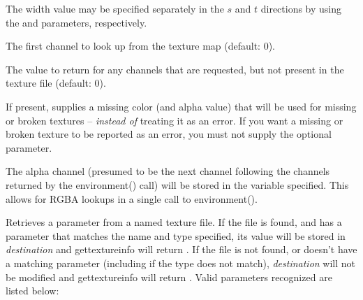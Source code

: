 \documentclass[11pt,letterpaper]{book}
\begin{document}
The width value may be specified separately in the $s$ and $t$
directions by using the  and  parameters,
respectively.
\apiend
\vspace{-16pt}

\vspace{12pt}
The first channel to look up from the texture map (default: 0).
\apiend
\vspace{-16pt}

\vspace{12pt}
The value to return for any channels that are requested, but 
not present in the texture file (default: 0).
\apiend
\vspace{-16pt}

\vspace{12pt}
If present, supplies a missing color (and alpha value) that will
be used for missing or broken textures -- \emph{instead of} treating
it as an error.  If you want a missing or broken texture to be reported
as an error, you must not supply the optional 
parameter.
\apiend
\vspace{-16pt}

\vspace{12pt}
The alpha channel (presumed to be the next channel following the
channels returned by the {\cf environment()} call) will be stored in the
variable specified.  This allows for RGBA lookups in a single call to
{\cf environment()}.
\apiend
\vspace{-16pt}

\apiend


\newpage
{}

Retrieves a parameter from a named texture file.  If the file is found,
and has a parameter that matches the name and type specified, its value
will be stored in \emph{destination} and {\cf gettextureinfo} will
return {}.  If the file is not found, or doesn't have a matching
parameter (including if the type does not match), \emph{destination}
will not be modified and {\cf gettextureinfo} will return {}.  Valid
parameters recognized are listed below:

\smallskip
\end{document}
